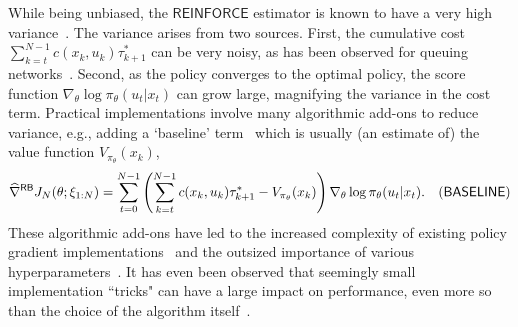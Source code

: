 While being unbiased, the $\mathsf{REINFORCE}$ estimator is known to have a very high variance~\cite{weaver2013optimal}. The variance arises from two sources. First, the cumulative cost $\sum_{k=t}^{N-1}c(x_{k},u_{k})\tau^{*}_{k+1}$ can be very noisy, as has been observed for queuing networks~\cite{dai2022queueing}. Second, 
as the policy converges to the optimal policy, the score function $\nabla_{\theta} \log \pi_{\theta}(u_{t}|x_{t})$ can grow large, magnifying the variance in the cost term.  Practical implementations involve many algorithmic add-ons to reduce variance, e.g., adding a `baseline' term~\cite{weaver2013optimal} which is usually (an estimate of) the value function $V_{\pi_{\theta}}(x_{k})$,
\begin{equation}
\label{eq:reinforce_baseline}
\widehat{\nabla}^{\mathsf{RB}} J_{N}(\theta; \xi_{1:N}) = \sum_{t=0}^{N-1} \left(\sum_{k=t}^{N-1}c(x_{k},u_{k})\tau^{*}_{k+1}  
 - V_{\pi_{\theta}}(x_{k})\right) \nabla_{\theta}\log \pi_{\theta}(u_{t}|x_{t}).
 \hspace{-1em}
 \tag{$\mathsf{BASELINE}$}
\end{equation}
These algorithmic add-ons have led to the increased complexity of existing policy gradient implementations~\cite{huang2022cleanrl} and the outsized importance of various hyperparameters~\cite{huang2022implementation}. It has even been observed that seemingly small implementation ``tricks" can have a large impact on performance, even more so than the choice of the algorithm itself~\cite{engstrom2020implementation}.



